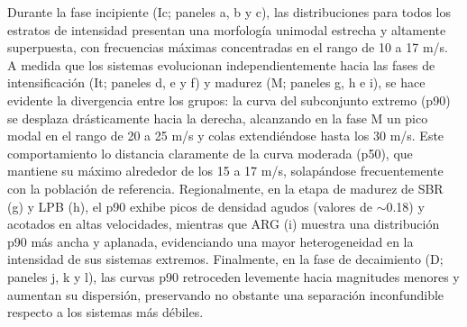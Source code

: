Durante la fase incipiente (Ic; paneles a, b y c), las distribuciones para todos los estratos de intensidad presentan una morfología unimodal estrecha y altamente superpuesta, con frecuencias máximas concentradas en el rango de 10 a 17 m/s. A medida que los sistemas evolucionan independientemente hacia las fases de intensificación (It; paneles d, e y f) y madurez (M; paneles g, h e i), se hace evidente la divergencia entre los grupos: la curva del subconjunto extremo (p90) se desplaza drásticamente hacia la derecha, alcanzando en la fase M un pico modal en el rango de 20 a 25 m/s y colas extendiéndose hasta los 30 m/s. Este comportamiento lo distancia claramente de la curva moderada (p50), que mantiene su máximo alrededor de los 15 a 17 m/s, solapándose frecuentemente con la población de referencia. Regionalmente, en la etapa de madurez de SBR (g) y LPB (h), el p90 exhibe picos de densidad agudos (valores de $\sim$0.18) y acotados en altas velocidades, mientras que ARG (i) muestra una distribución p90 más ancha y aplanada, evidenciando una mayor heterogeneidad en la intensidad de sus sistemas extremos. Finalmente, en la fase de decaimiento (D; paneles j, k y l), las curvas p90 retroceden levemente hacia magnitudes menores y aumentan su dispersión, preservando no obstante una separación inconfundible respecto a los sistemas más débiles.

